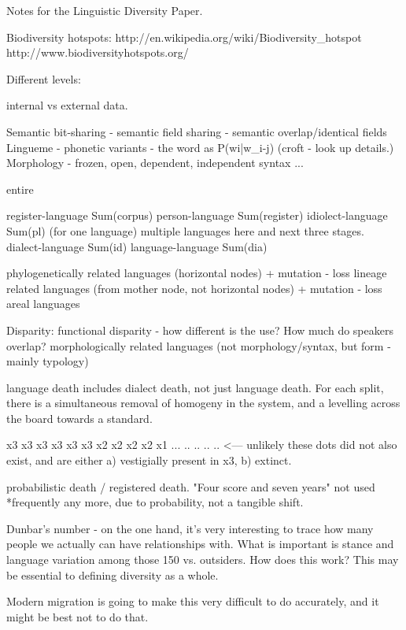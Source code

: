 Notes for the Linguistic Diversity Paper. 

Biodiversity hotspots:
http://en.wikipedia.org/wiki/Biodiversity_hotspot
http://www.biodiversityhotspots.org/

Different levels:

internal vs external data. 

Semantic bit-sharing - semantic field sharing - semantic overlap/identical fields
Lingueme - phonetic variants - the word as P(wi|w_i-j) (croft - look up details.)
Morphology - frozen, open, dependent, independent
syntax ...

entire 

register-language Sum(corpus)
person-language Sum(register)
idiolect-language Sum(pl) (for one language) multiple languages here and next three stages. 
dialect-language Sum(id)
language-language Sum(dia)

phylogenetically related languages (horizontal nodes) + mutation - loss
lineage related languages (from mother node, not horizontal nodes) + mutation - loss
areal languages

Disparity:
functional disparity - how different is the use? How much do speakers overlap?
morphologically related languages (not morphology/syntax, but form - mainly typology)

language death includes dialect death, not just language death. For each split, there is a simultaneous removal of homogeny in the system, and a levelling across the board towards a standard. 

x3 x3 x3 x3 x3 x3
x2 x2 x2 x2 
x1 ... .. .. .. .. <--- unlikely these dots did not also exist, and are either a) vestigially present in x3, b) extinct. 

probabilistic death / registered death. "Four score and seven years" not used *frequently any more, due to probability, not a tangible shift. 


Dunbar's number - on the one hand, it's very interesting to trace how many people we actually can have relationships with. What is important is stance and language variation among those 150 vs. outsiders. How does this work? This may be essential to defining diversity as a whole. 

Modern migration is going to make this very difficult to do accurately, and it might be best not to do that. 